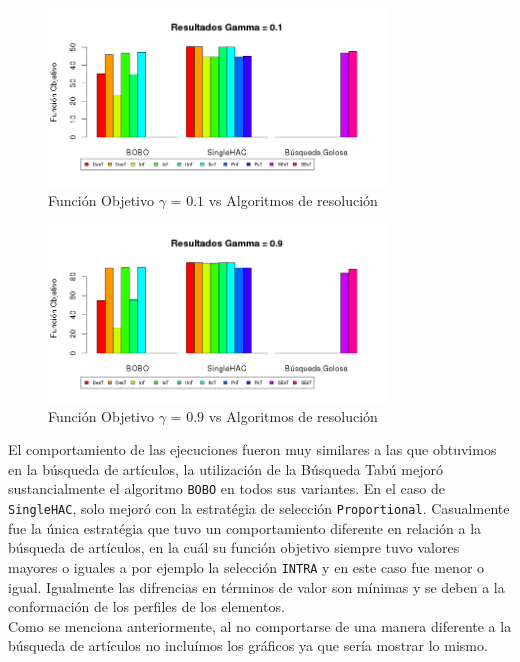 \begin{figure}[H]
  \centering
    \includegraphics[width=0.8\textwidth]{resultados/authors/Graficos_agrupados/gamma01-autores.png}
  \caption{Función Objetivo $\gamma$ = $0.1$ vs Algoritmos de resolución}
  \label{res:img-autores-agr-gamma01}
\end{figure}

\begin{figure}[H]
  \centering
    \includegraphics[width=0.8\textwidth]{resultados/authors/Graficos_agrupados/gamma09-autores.png}
  \caption{Función Objetivo $\gamma$ = $0.9$ vs Algoritmos de resolución}
  \label{res:img-autores-agr-gamma09}
\end{figure}

El comportamiento de las ejecuciones fueron muy similares a las que obtuvimos en la búsqueda de artículos, la utilización de la Búsqueda Tabú mejoró sustancialmente el algoritmo \texttt{BOBO} en todos sus variantes. En el caso de \texttt{SingleHAC}, solo mejoró con la estratégia de selección \texttt{Proportional}. Casualmente fue la única estratégia que tuvo un comportamiento diferente en relación a la búsqueda de artículos, en la cuál su función objetivo siempre tuvo valores mayores o iguales a por ejemplo la selección \texttt{INTRA} y en este caso fue menor o igual. Igualmente las difrencias en términos de valor son mínimas y se deben a la conformación de los perfiles de los elementos.\\
Como se menciona anteriormente, al no comportarse de una manera diferente a la búsqueda de artículos no incluímos los gráficos ya que sería mostrar lo mismo.
\newpage
